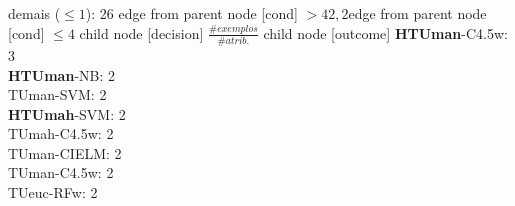 {{{{%
demais ($\leq 1$): 26} edge from parent node [cond] {$>42,2$}}edge from parent node [cond] {$\leq4$}}
child {node [decision] {$\frac{\#exemplos}{\#atrib.}$}
child {node [outcome] {
\textbf{HTUman}-C4.5w: 3\\
\textbf{HTUman}-NB: 2\\
TUman-SVM: 2\\
\textbf{HTUmah}-SVM: 2\\
TUmah-C4.5w: 2\\
TUman-CIELM: 2\\
TUman-C4.5w: 2\\
TUeuc-RFw: 2\\
}}}}
